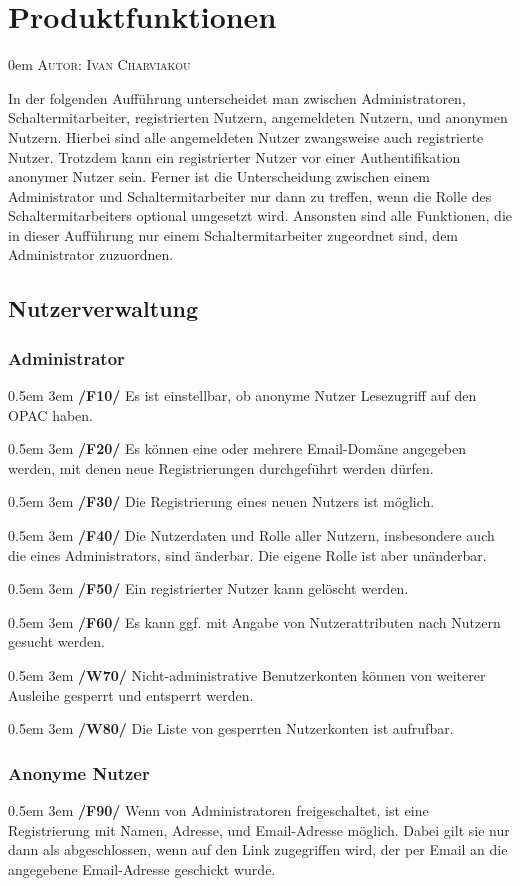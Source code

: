 \documentclass{article}
\makeatletter
\newcommand{\sectionauthor}[1]{
	{\parindent 0em \large \scshape Autor: #1 \par \nobreak \vspace*{2em}}
	\@afterheading
}
\newcommand{\specification}[3]{
	{\parindent 0.5em \hangindent 3em \hypertarget{spec:#1:#2}{\textbf{/#1#2/}} #3 \par \nobreak \vspace*{0.5em}}
}
\makeatother
\begin{document}
\section{Produktfunktionen} %
\sectionauthor{Ivan Charviakou}
In der folgenden Aufführung unterscheidet man zwischen Administratoren, Schaltermitarbeiter, registrierten Nutzern, angemeldeten Nutzern, und anonymen Nutzern.
Hierbei sind alle angemeldeten Nutzer zwangsweise auch registrierte Nutzer. Trotzdem kann ein registrierter Nutzer vor einer Authentifikation anonymer Nutzer sein.
Ferner ist die Unterscheidung zwischen einem Administrator und Schaltermitarbeiter nur dann zu treffen, wenn die Rolle des Schaltermitarbeiters optional umgesetzt wird.
Ansonsten sind alle Funktionen, die in dieser Aufführung nur einem Schaltermitarbeiter zugeordnet sind, dem Administrator zuzuordnen.
	\subsection{Nutzerverwaltung}
		\subsubsection{Administrator}
			\specification{F}{10}{Es ist einstellbar, ob anonyme Nutzer Lesezugriff auf den OPAC haben.}
			\specification{F}{20}{Es können eine oder mehrere Email-Domäne angegeben werden, mit denen neue Registrierungen durchgeführt werden dürfen.}
			\specification{F}{30}{Die Registrierung eines neuen Nutzers ist möglich.}
			\specification{F}{40}{Die Nutzerdaten und Rolle aller Nutzern, insbesondere auch die eines Administrators, sind änderbar. Die eigene Rolle ist aber unänderbar. }
			\specification{F}{50}{Ein registrierter Nutzer kann gelöscht werden.}
			\specification{F}{60}{Es kann ggf. mit Angabe von Nutzerattributen nach Nutzern gesucht werden.}
			\specification{W}{70}{Nicht-administrative Benutzerkonten können von weiterer Ausleihe gesperrt und entsperrt werden.}
			\specification{W}{80}{Die Liste von gesperrten Nutzerkonten ist aufrufbar.}
		\subsubsection{Anonyme Nutzer}
			\specification{F}{90}{Wenn von Administratoren freigeschaltet, ist eine Registrierung mit Namen, Adresse, und Email-Adresse möglich. 
				Dabei gilt sie nur dann als abgeschlossen, wenn auf den Link zugegriffen wird, der per Email an die angegebene Email-Adresse geschickt wurde. }
\end{document}
